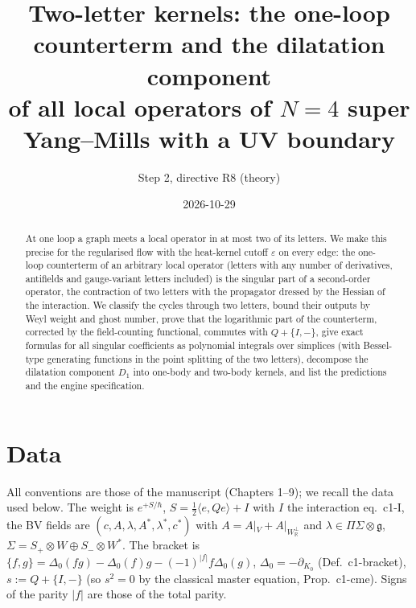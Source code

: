 \documentclass[11pt]{article}
\title{Two-letter kernels: the one-loop counterterm and the dilatation component\\ of all local operators of $N=4$ super Yang--Mills with a UV boundary}
\author{Step 2, directive R8 (theory)}
\date{2026-10-29}
\numberwithin{equation}{section}
\theoremstyle{plain}
\theoremstyle{definition}
\begin{document}
\maketitle

\begin{abstract}
At one loop a graph meets a local operator in at most two of its letters. We make this precise for the regularised flow with the heat-kernel cutoff $\varepsilon$ on every edge: the one-loop counterterm of an arbitrary local operator (letters with any number of derivatives, antifields and gauge-variant letters included) is the singular part of a second-order operator, the contraction of two letters with the propagator dressed by the Hessian of the interaction. We classify the cycles through two letters, bound their outputs by Weyl weight and ghost number, prove that the logarithmic part of the counterterm, corrected by the field-counting functional, commutes with $Q+\{I,-\}$, give exact formulas for all singular coefficients as polynomial integrals over simplices (with Bessel-type generating functions in the point splitting of the two letters), decompose the dilatation component $D_1$ into one-body and two-body kernels, and list the predictions and the engine specification.
\end{abstract}

\tableofcontents

\section{Data}
\label{sec:tl-data}

All conventions are those of the manuscript (Chapters 1--9); we recall the data used below. The weight is $e^{+S/\hbar}$, $S=\tfrac12\langle e,Qe\rangle+I$ with $I$ the interaction eq.~c1-I, the BV fields are $(c,A,\lambda,A^*,\lambda^*,c^*)$ with $A=A|_V+A|_{W_{\mathbb R}^\perp}$ and $\lambda\in\Pi\Sigma\otimes\mathfrak g$, $\Sigma=S_+\otimes W\oplus S_-\otimes W^*$. The bracket is $\{f,g\}=\Delta_0(fg)-\Delta_0(f)g-(-1)^{|f|}f\Delta_0(g)$, $\Delta_0=-\partial_{K_0}$ (Def.~c1-bracket), $s:=Q+\{I,-\}$ (so $s^2=0$ by the classical master equation, Prop.~c1-cme). Signs of the parity $|f|$ are those of the total parity.
\end{document}
